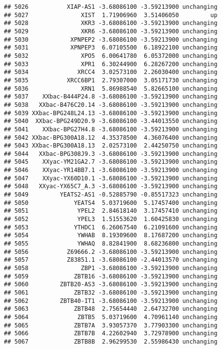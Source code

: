 \documentclass[]{article}
\begin{document}
\begin{verbatim}
## 5026           XIAP-AS1 -3.68086100 -3.59213900 unchanging
## 5027               XIST  1.71906960  3.51406050         up
## 5028               XKR3 -3.68086100 -3.59213900 unchanging
## 5029               XKR6 -3.68086100 -3.59213900 unchanging
## 5030            XPNPEP2 -3.68086100 -3.59213900 unchanging
## 5031            XPNPEP3  6.07105500  6.18922100 unchanging
## 5032               XPO5  6.00641780  6.05372000 unchanging
## 5033               XPR1  6.30244900  6.28267200 unchanging
## 5034              XRCC4  3.02573100  2.26030400 unchanging
## 5035           XRCC6BP1  2.79307000  3.05171730 unchanging
## 5036               XRN1  5.86988540  5.82665100 unchanging
## 5037    XXbac-B444P24.8 -3.68086100 -3.59213900 unchanging
## 5038   XXbac-B476C20.14 -3.68086100 -3.59213900 unchanging
## 5039 XXbac-BPG248L24.13 -3.68086100 -3.59213900 unchanging
## 5040  XXbac-BPG249D20.9 -3.68086100 -3.44013550 unchanging
## 5041    XXbac-BPG27H4.8 -3.68086100 -3.59213900 unchanging
## 5042 XXbac-BPG300A18.12  4.35378500  4.36076400 unchanging
## 5043 XXbac-BPG300A18.13  2.02573100  2.44250750 unchanging
## 5044   XXbac-BPG308J9.3 -3.68086100 -3.59213900 unchanging
## 5045    XXyac-YM21GA2.7 -3.68086100 -3.59213900 unchanging
## 5046    XXyac-YR14BB7.1 -3.68086100 -3.59213900 unchanging
## 5047    XXyac-YX60D10.1 -3.68086100 -3.59213900 unchanging
## 5048   XXyac-YX65C7_A.3 -3.68086100 -3.59213900 unchanging
## 5049         YEATS2-AS1 -0.52885790 -0.85517323 unchanging
## 5050             YEATS4  5.03719600  5.17457400 unchanging
## 5051              YPEL2  2.84618140  3.17457410 unchanging
## 5052              YPEL3  1.51553620  1.60425830 unchanging
## 5053             YTHDC1  6.26067540  6.21091600 unchanging
## 5054              YWHAB  8.19309600  8.17687200 unchanging
## 5055              YWHAQ  8.82841900  8.68236800 unchanging
## 5056           Z69666.2 -3.68086100 -3.59213900 unchanging
## 5057           Z83851.1 -3.68086100 -2.44013570 unchanging
## 5058               ZBP1 -3.68086100 -3.59213900 unchanging
## 5059             ZBTB16 -3.68086100 -3.59213900 unchanging
## 5060         ZBTB20-AS3 -3.68086100 -3.59213900 unchanging
## 5061             ZBTB32 -3.68086100 -3.59213900 unchanging
## 5062         ZBTB40-IT1 -3.68086100 -3.59213900 unchanging
## 5063             ZBTB48  2.75654440  2.64732700 unchanging
## 5064              ZBTB5  5.03719600  4.70961140 unchanging
## 5065             ZBTB7A  3.93057370  3.77903300 unchanging
## 5066             ZBTB7B  4.22602940  3.72978900 unchanging
## 5067             ZBTB8B  2.96299530  2.55986430 unchanging

\end{verbatim}
\end{document}
